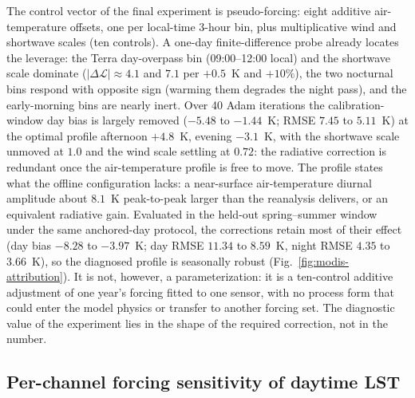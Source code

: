 The control vector of the final experiment is pseudo-forcing: eight additive
air-temperature offsets, one per local-time 3-hour bin, plus multiplicative
wind and shortwave scales (ten controls). A one-day finite-difference probe
already locates the leverage: the Terra day-overpass bin (09:00--12:00 local)
and the shortwave scale dominate ($|\Delta\mathcal{L}| \approx 4.1$ and
$7.1$ per $+0.5$~K and $+10\%$), the two nocturnal bins respond with
opposite sign (warming them degrades the night pass), and the early-morning
bins are nearly inert. Over 40 Adam iterations the calibration-window day
bias is largely removed ($-5.48$ to $-1.44$~K; RMSE $7.45$ to $5.11$~K) at
the optimal profile afternoon $+4.8$~K, evening $-3.1$~K, with the
shortwave scale unmoved at $1.0$ and the wind scale settling at $0.72$: the
radiative correction is redundant once the air-temperature profile is free
to move. The profile states what the offline configuration
lacks: a near-surface air-temperature diurnal amplitude about $8.1$~K
peak-to-peak larger than the reanalysis delivers, or an equivalent radiative
gain. Evaluated in the held-out spring--summer window under the same
anchored-day protocol, the corrections retain most of their effect (day
bias $-8.28$ to $-3.97$~K; day RMSE $11.34$ to $8.59$~K, night RMSE $4.35$
to $3.66$~K), so the diagnosed profile is seasonally robust
(Fig.~\ref{fig:modis-attribution}). It is not,
however, a parameterization: it is a ten-control additive adjustment of one
year's forcing fitted to one sensor, with no process form that could enter
the model physics or transfer to another forcing set. The diagnostic value
of the experiment lies in the shape of the required correction, not in the
number.

\subsection{Per-channel forcing sensitivity of daytime LST}
\label{sec:forcing-sensitivity}

